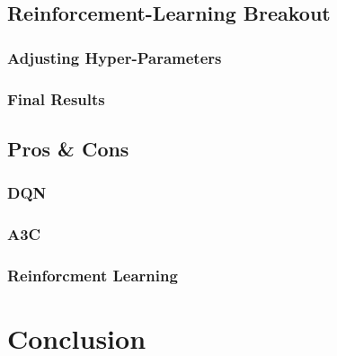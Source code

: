 \documentclass[conference]{IEEEtran}
\begin{document}
\subsection{Reinforcement-Learning Breakout}
\subsubsection{Adjusting Hyper-Parameters}
\subsubsection{Final Results}

\subsection{Pros \& Cons}
\subsubsection{DQN}
\subsubsection{A3C}
\subsubsection{Reinforcment Learning}
\section{Conclusion}

\newpage
\printbibliography
\end{document}
